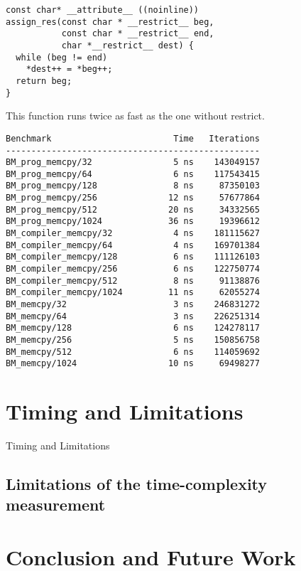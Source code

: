 \documentclass{sig-alternate}
\begin{document}
\begin{verbatim}
const char* __attribute__ ((noinline))
assign_res(const char * __restrict__ beg,
           const char * __restrict__ end,
           char *__restrict__ dest) {
  while (beg != end)
    *dest++ = *beg++;
  return beg;
}
\end{verbatim}

This function runs twice as fast as the one without restrict.

\begin{verbatim}
Benchmark                        Time   Iterations
--------------------------------------------------
BM_prog_memcpy/32                5 ns    143049157
BM_prog_memcpy/64                6 ns    117543415
BM_prog_memcpy/128               8 ns     87350103
BM_prog_memcpy/256              12 ns     57677864
BM_prog_memcpy/512              20 ns     34332565
BM_prog_memcpy/1024             36 ns     19396612
BM_compiler_memcpy/32            4 ns    181115627
BM_compiler_memcpy/64            4 ns    169701384
BM_compiler_memcpy/128           6 ns    111126103
BM_compiler_memcpy/256           6 ns    122750774
BM_compiler_memcpy/512           8 ns     91138876
BM_compiler_memcpy/1024         11 ns     62055274
BM_memcpy/32                     3 ns    246831272
BM_memcpy/64                     3 ns    226251314
BM_memcpy/128                    6 ns    124278117
BM_memcpy/256                    5 ns    150856758
BM_memcpy/512                    6 ns    114059692
BM_memcpy/1024                  10 ns     69498277
\end{verbatim}


\section{Timing and Limitations}
Timing and Limitations
\subsection{Limitations of the time-complexity measurement}

\section{Conclusion and Future Work}


{\small

}
\end{document}
